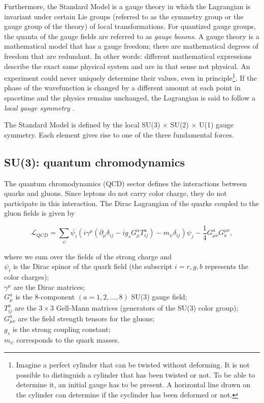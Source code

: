 Furthermore, the Standard Model is a gauge theory in which the Lagrangian is invariant under certain Lie groups (referred to as the symmetry group or the gauge group of the theory) of local transformations. For quantized gauge groups, the quanta of the gauge fields are referred to as \textit{gauge bosons}. A gauge theory is a mathematical model that has a gauge freedom; there are mathematical degrees of freedom that are redundant. In other words: different mathematical expressions describe the exact same physical system and are in that sense not physical. An experiment could never uniquely determine their values, even in principle\footnote{Imagine a perfect cylinder that can be twisted without deforming. It is not possible to distinguish a cylinder that has been twisted or not. To be able to determine it, an initial gauge has to be present. A horizontal line drawn on the cylinder can determine if the cyclinder has been deformed or not.}. If the phase of the wavefunction is changed by a different amount at each point in spacetime and the physics remains unchanged, the Lagrangian is said to follow a \textit{local gauge symmetry} \cite{mandl2013quantum}.

The Standard Model is defined by the local SU(3) $\times$ SU(2) $\times$ U(1) gauge symmetry. Each element gives rise to one of the three fundamental forces.
\subsection{SU(3): quantum chromodynamics}
\label{subsec:QCD}
The quantum chromodynamics (QCD) sector defines the interactions between quarks and gluons. Since leptons do not carry color charge, they do not participate in this interaction. The Dirac Lagrangian of the quarks coupled to the gluon fields is given by


\begin{equation}
\mathcal{L}_{QCD} = \sum_{\psi} \bar{\psi_i} \left(i \gamma^\mu \left(\partial_\mu  \delta_{ij} - i g_s G^a_{\mu} T^a_{ij}\right) - m_\psi \delta_{ij} \right) \psi_j - \frac{1}{4} G^a_{\mu\nu}G^{\mu\nu}_a,
\end{equation}

where we sum over the fields of the strong charge and\\
\indent $\psi_i$ is the Dirac spinor of the quark field (the subscript $i={r,g,b}$ represents the color charges);\\
\indent $\gamma^\mu$ are the Dirac matrices;\\
\indent $G^a_\mu$ is the 8-component $\left(a=1,2,...,8\right)$ SU(3) gauge field;\\
\indent $T^a_{ij}$ are the $3\times3$ Gell-Mann matrices (generators of the SU(3) color group);\\
\indent $G^a_{\mu\nu}$ are the field strength tensors for the gluons;\\
\indent $g_s$ is the strong coupling constant;\\
\indent $m_\psi$ corresponds to the quark masses.


